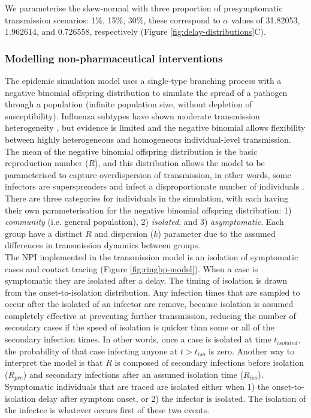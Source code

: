 \documentclass{article}
\begin{document}
We parameterise the skew-normal with three proportion of presymptomatic transmission scenarios: 1\%, 15\%, 30\%, these correspond to $\alpha$ values of 31.82053, 1.962614, and 0.726558, respectively (Figure \ref{fig:delay-distributions}C).

\subsubsection*{Modelling non-pharmaceutical interventions}

The epidemic simulation model uses a single-type branching process with a negative binomial offspring distribution to simulate the spread of a pathogen through a population (infinite population size, without depletion of susceptibility). Influenza subtypes have shown moderate transmission heterogeneity \citep{fraserPandemicPotentialStrain2009, heComparingCOVID191918192020, Ward2024.12.11.24318702}, but evidence is limited and the negative binomial allows flexibility between highly heterogeneous and homogeneous individual-level transmission. The mean of the negative binomial offspring distribution is the basic reproduction number ($R$), and this distribution allows the model to be parameterised to capture overdispersion of transmission, in other words, some infectors are superspreaders and infect a disproportionate number of individuals \citep{lloyd-smithSuperspreadingEffectIndividual2005, kucharskiEarlyDynamicsTransmission2020}. \\

There are three categories for individuals in the simulation, with each having their own parameterisation for the negative binomial offspring distribution: 1) \textit{community} (i.e. general population), 2) \textit{isolated}, and 3) \textit{asymptomatic}. Each group have a distinct $R$ and dispersion ($k$) parameter due to the assumed differences in transmission dynamics between groups. \\

The NPI implemented in the transmission model is an isolation of symptomatic cases and contact tracing (Figure \ref{fig:ringbp-model}). When a case is symptomatic they are isolated after a delay. The timing of isolation is drawn from the onset-to-isolation distribution. Any infection times that are sampled to occur after the isolated of an infector are remove, because isolation is assumed completely effective at preventing further transmission, reducing the number of secondary cases if the speed of isolation is quicker than some or all of the secondary infection times. In other words, once a case is isolated at time $t_{isolated}$, the probability of that case infecting anyone at $t > t_{iso}$ is zero. Another way to interpret the model is that $R$ is composed of secondary infections before isolation ($R_{pre}$) and secondary infections after an assumed isolation time ($R_{iso}$). Symptomatic individuals that are traced are isolated either when 1) the onset-to-isolation delay after symptom onset, or 2) the infector is isolated. The isolation of the infectee is whatever occurs first of these two events.
\end{document}
